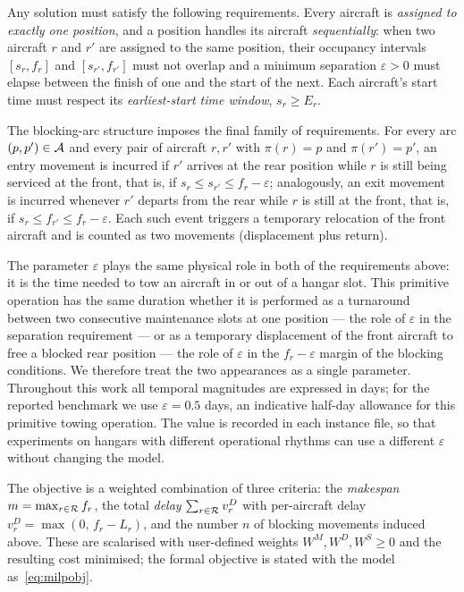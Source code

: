 Any solution must satisfy the following requirements.  Every aircraft is
\emph{assigned to exactly one position}, and a position handles its
aircraft \emph{sequentially}: when two aircraft $r$ and $r'$ are assigned
to the same position, their occupancy intervals $[s_r, f_r]$ and
$[s_{r'}, f_{r'}]$ must not overlap and a minimum separation
$\varepsilon > 0$ must elapse between the finish of one and the start of
the next.  Each aircraft's start time must respect its
\emph{earliest-start time window}, $s_r \ge E_r$.

The blocking-arc structure imposes the final family of requirements.  For
every arc $(p, p') \in \mathcal{A}$ and every pair of aircraft $r, r'$ with
$\pi(r) = p$ and $\pi(r') = p'$, an entry movement is incurred if $r'$
arrives at the rear position while $r$ is still being serviced at the
front, that is, if $s_r \le s_{r'} \le f_r - \varepsilon$; analogously,
an exit movement is incurred whenever $r'$ departs from the rear while
$r$ is still at the front, that is, if $s_r \le f_{r'} \le f_r -
\varepsilon$.  Each such event triggers a temporary relocation of the
front aircraft and is counted as two movements (displacement plus return).

The parameter $\varepsilon$ plays the same physical role in both of the
requirements above: it is the time needed to tow an aircraft in or out of
a hangar slot.  This primitive operation has the same duration whether it
is performed as a turnaround between two consecutive maintenance slots at
one position --- the role of $\varepsilon$ in the separation requirement
--- or as a temporary displacement of the front aircraft to free a
blocked rear position --- the role of $\varepsilon$ in the
$f_r - \varepsilon$ margin of the blocking conditions.  We therefore
treat the two appearances as a single parameter.  Throughout this work
all temporal magnitudes are expressed in days; for the reported benchmark
we use $\varepsilon = 0.5$ days, an indicative half-day allowance for
this primitive towing operation.  The value is recorded in each instance
file, so that experiments on hangars with different operational rhythms
can use a different $\varepsilon$ without changing the model.

The objective is a weighted combination of three criteria: the
\emph{makespan} $m = \max_{r \in \mathcal{R}} f_r$, the total \emph{delay}
$\sum_{r \in \mathcal{R}} v^D_r$ with per-aircraft delay
$v^D_r = \max(0,\, f_r - L_r)$, and the number $n$ of blocking movements
induced above.  These are scalarised with user-defined weights
$W^M, W^D, W^S \ge 0$ and the resulting cost minimised; the formal
objective is stated with the model as~\eqref{eq:milpobj}.

